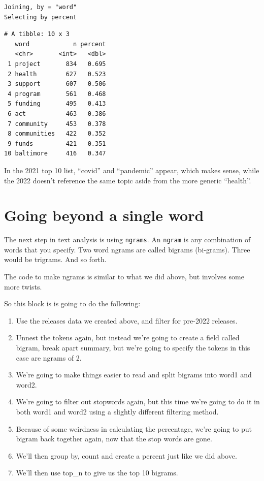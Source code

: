 \documentclass[
  letterpaper,
  DIV=11,
  numbers=noendperiod]{scrreprt}
\providecommand{\tightlist}{%
  \setlength{\itemsep}{0pt}\setlength{\parskip}{0pt}}\usepackage{longtable,booktabs,array}
\begin{document}
\begin{verbatim}
Joining, by = "word"
Selecting by percent
\end{verbatim}

\begin{verbatim}
# A tibble: 10 x 3
   word            n percent
   <chr>       <int>   <dbl>
 1 project       834   0.695
 2 health        627   0.523
 3 support       607   0.506
 4 program       561   0.468
 5 funding       495   0.413
 6 act           463   0.386
 7 community     453   0.378
 8 communities   422   0.352
 9 funds         421   0.351
10 baltimore     416   0.347
\end{verbatim}

In the 2021 top 10 list, ``covid'' and ``pandemic'' appear, which makes
sense, while the 2022 doesn't reference the same topic aside from the
more generic ``health''.

\hypertarget{going-beyond-a-single-word}{%
\section{Going beyond a single word}\label{going-beyond-a-single-word}}

The next step in text analysis is using \texttt{ngrams}. An
\texttt{ngram} is any combination of words that you specify. Two word
ngrams are called bigrams (bi-grams). Three would be trigrams. And so
forth.

The code to make ngrams is similar to what we did above, but involves
some more twists.

So this block is is going to do the following:

\begin{enumerate}
\def\labelenumi{\arabic{enumi}.}
\tightlist
\item
  Use the releases data we created above, and filter for pre-2022
  releases.
\item
  Unnest the tokens again, but instead we're going to create a field
  called bigram, break apart summary, but we're going to specify the
  tokens in this case are ngrams of 2.
\item
  We're going to make things easier to read and split bigrams into word1
  and word2.
\item
  We're going to filter out stopwords again, but this time we're going
  to do it in both word1 and word2 using a slightly different filtering
  method.
\item
  Because of some weirdness in calculating the percentage, we're going
  to put bigram back together again, now that the stop words are gone.
\item
  We'll then group by, count and create a percent just like we did
  above.
\item
  We'll then use top\_n to give us the top 10 bigrams.
\end{enumerate}
\end{document}
